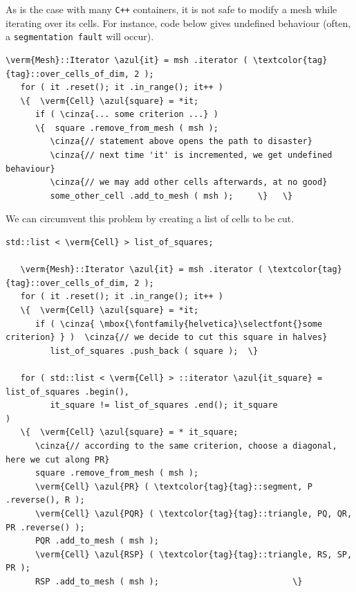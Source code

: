 As is the case with many {\tt C++} containers, it is not safe to modify a mesh while
iterating over its cells.
For instance, code below gives undefined behaviour (often, a {\small\tt segmentation fault}
will occur).

\begin{Verbatim}[commandchars=\\\{\},formatcom=\small\tt,frame=single,
   label=incorrect code !,rulecolor=\color{coment},
   baselinestretch=0.94,framesep=2mm]
   \verm{Mesh}::Iterator \azul{it} = msh .iterator ( \textcolor{tag}{tag}::over_cells_of_dim, 2 );
   for ( it .reset(); it .in_range(); it++ )
   \{  \verm{Cell} \azul{square} = *it;
      if ( \cinza{... some criterion ...} )
      \{  square .remove_from_mesh ( msh );
         \cinza{// statement above opens the path to disaster}
         \cinza{// next time 'it' is incremented, we get undefined behaviour}
         \cinza{// we may add other cells afterwards, at no good}
         some_other_cell .add_to_mesh ( msh );     \}   \}
\end{Verbatim}

We can circumvent this problem by creating a list of cells to be cut.

\begin{Verbatim}[commandchars=\\\{\},formatcom=\small\tt,frame=single,
   label=parag-\ref{\numb section 10.\numb parag 3}.cpp,rulecolor=\color{coment},
   baselinestretch=0.94,framesep=2mm]
   std::list < \verm{Cell} > list_of_squares;

   \verm{Mesh}::Iterator \azul{it} = msh .iterator ( \textcolor{tag}{tag}::over_cells_of_dim, 2 );
   for ( it .reset(); it .in_range(); it++ )
   \{  \verm{Cell} \azul{square} = *it;
      if ( \cinza{ \mbox{\fontfamily{helvetica}\selectfont{}some criterion} } )  \cinza{// we decide to cut this square in halves}
         list_of_squares .push_back ( square );  \}

   for ( std::list < \verm{Cell} > ::iterator \azul{it_square} = list_of_squares .begin(),
         it_square != list_of_squares .end(); it_square               )
   \{  \verm{Cell} \azul{square} = * it_square;
      \cinza{// according to the same criterion, choose a diagonal, here we cut along PR}
      square .remove_from_mesh ( msh );
      \verm{Cell} \azul{PR} ( \textcolor{tag}{tag}::segment, P .reverse(), R );
      \verm{Cell} \azul{PQR} ( \textcolor{tag}{tag}::triangle, PQ, QR, PR .reverse() );
      PQR .add_to_mesh ( msh );
      \verm{Cell} \azul{RSP} ( \textcolor{tag}{tag}::triangle, RS, SP, PR );
      RSP .add_to_mesh ( msh );                           \}
\end{Verbatim}


